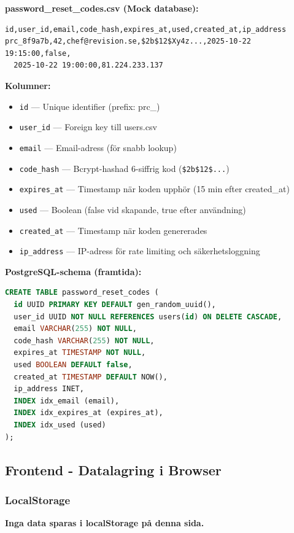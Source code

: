 \documentclass[12pt,a4paper]{article}
\begin{document}
\textbf{password\_reset\_codes.csv (Mock database):}
\begin{verbatim}
id,user_id,email,code_hash,expires_at,used,created_at,ip_address
prc_8f9a7b,42,chef@revision.se,$2b$12$Xy4z...,2025-10-22 19:15:00,false,
  2025-10-22 19:00:00,81.224.233.137
\end{verbatim}

\textbf{Kolumner:}
\begin{itemize}[noitemsep]
  \item \texttt{id} — Unique identifier (prefix: prc\_)
  \item \texttt{user\_id} — Foreign key till users.csv
  \item \texttt{email} — Email-adress (för snabb lookup)
  \item \texttt{code\_hash} — Bcrypt-hashad 6-siffrig kod (\texttt{\$2b\$12\$...})
  \item \texttt{expires\_at} — Timestamp när koden upphör (15 min efter created\_at)
  \item \texttt{used} — Boolean (false vid skapande, true efter användning)
  \item \texttt{created\_at} — Timestamp när koden genererades
  \item \texttt{ip\_address} — IP-adress för rate limiting och säkerhetsloggning
\end{itemize}

\textbf{PostgreSQL-schema (framtida):}
\begin{lstlisting}[language=sql]
CREATE TABLE password_reset_codes (
  id UUID PRIMARY KEY DEFAULT gen_random_uuid(),
  user_id UUID NOT NULL REFERENCES users(id) ON DELETE CASCADE,
  email VARCHAR(255) NOT NULL,
  code_hash VARCHAR(255) NOT NULL,
  expires_at TIMESTAMP NOT NULL,
  used BOOLEAN DEFAULT false,
  created_at TIMESTAMP DEFAULT NOW(),
  ip_address INET,
  INDEX idx_email (email),
  INDEX idx_expires_at (expires_at),
  INDEX idx_used (used)
);
\end{lstlisting}

\subsection{Frontend - Datalagring i Browser}

\subsubsection{LocalStorage}
\textbf{Inga data sparas i localStorage på denna sida.}
\end{document}
